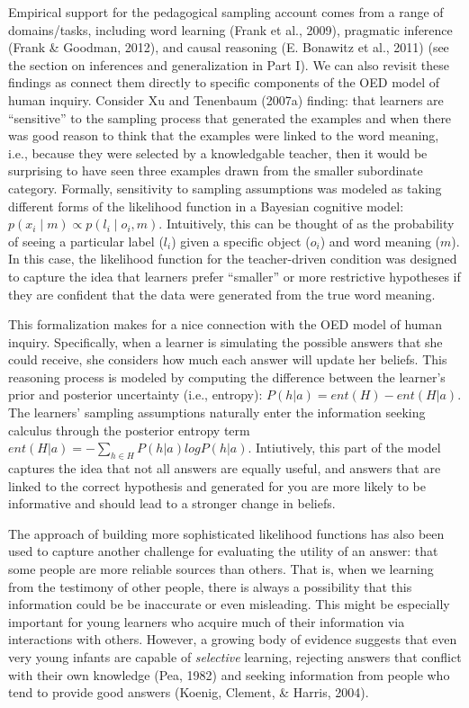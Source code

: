 \documentclass[english,floatsintext,man]{apa6}
\theoremstyle{definition}
\theoremstyle{definition}
\theoremstyle{definition}
\theoremstyle{remark}
\begin{document}
Empirical support for the pedagogical sampling account comes from a
range of domains/tasks, including word learning (Frank et al., 2009),
pragmatic inference (Frank \& Goodman, 2012), and causal reasoning (E.
Bonawitz et al., 2011) (see the section on inferences and generalization
in Part I). We can also revisit these findings as connect them directly
to specific components of the OED model of human inquiry. Consider Xu
and Tenenbaum (2007a) finding: that learners are \enquote{sensitive} to
the sampling process that generated the examples and when there was good
reason to think that the examples were linked to the word meaning, i.e.,
because they were selected by a knowledgable teacher, then it would be
surprising to have seen three examples drawn from the smaller
subordinate category. Formally, sensitivity to sampling assumptions was
modeled as taking different forms of the likelihood function in a
Bayesian cognitive model: \(p(x_i \mid m) \propto p(l_i \mid o_i, m)\).
Intuitively, this can be thought of as the probability of seeing a
particular label (\(l_i\)) given a specific object (\(o_i\)) and word
meaning (\(m\)). In this case, the likelihood function for the
teacher-driven condition was designed to capture the idea that learners
prefer \enquote{smaller} or more restrictive hypotheses if they are
confident that the data were generated from the true word meaning.

This formalization makes for a nice connection with the OED model of
human inquiry. Specifically, when a learner is simulating the possible
answers that she could receive, she considers how much each answer will
update her beliefs. This reasoning process is modeled by computing the
difference between the learner's prior and posterior uncertainty (i.e.,
entropy): \(P(h|a) = ent(H) - ent(H|a)\). The learners' sampling
assumptions naturally enter the information seeking calculus through the
posterior entropy term \(ent(H|a) = -\sum_{h\in H}{P(h|a)logP(h|a)}\).
Intiutively, this part of the model captures the idea that not all
answers are equally useful, and answers that are linked to the correct
hypothesis and generated for you are more likely to be informative and
should lead to a stronger change in beliefs.

The approach of building more sophisticated likelihood functions has
also been used to capture another challenge for evaluating the utility
of an answer: that some people are more reliable sources than others.
That is, when we learning from the testimony of other people, there is
always a possibility that this information could be be inaccurate or
even misleading. This might be especially important for young learners
who acquire much of their information via interactions with others.
However, a growing body of evidence suggests that even very young
infants are capable of \emph{selective} learning, rejecting answers that
conflict with their own knowledge (Pea, 1982) and seeking information
from people who tend to provide good answers (Koenig, Clement, \&
Harris, 2004).
\end{document}
